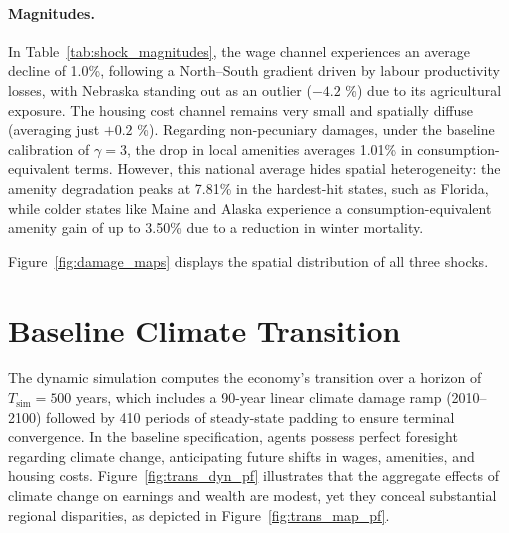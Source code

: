 \documentclass[11pt, a4paper]{article}
\begin{document}
\paragraph{Magnitudes.}
In Table~\ref{tab:shock_magnitudes}, the wage channel experiences an average decline of 1.0\%, following a North--South gradient driven by labour productivity losses, with Nebraska standing out as an outlier ($-4.2$ \%) due to its agricultural exposure. The housing cost channel remains very small and spatially diffuse (averaging just $+0.2$ \%). Regarding non-pecuniary damages, under the baseline calibration of $\gamma = 3$, the drop in local amenities averages 1.01\% in consumption-equivalent terms. However, this national average hides spatial heterogeneity: the amenity degradation peaks at 7.81\% in the hardest-hit states, such as Florida, while colder states like Maine and Alaska experience a consumption-equivalent amenity gain of up to 3.50\% due to a reduction in winter mortality.

Figure~\ref{fig:damage_maps} displays the spatial distribution of all three shocks.



\section{Baseline Climate Transition}
\label{sec:baseline}
The dynamic simulation computes the economy's transition over a horizon of $T_{\text{sim}} = 500$ years, which includes a 90-year linear climate damage ramp (2010--2100) followed by 410 periods of steady-state padding to ensure terminal convergence. In the baseline specification, agents possess perfect foresight regarding climate change, anticipating future shifts in wages, amenities, and housing costs. Figure~\ref{fig:trans_dyn_pf} illustrates that the aggregate effects of climate change on earnings and wealth are modest, yet they conceal substantial regional disparities, as depicted in Figure~\ref{fig:trans_map_pf}.
\end{document}
